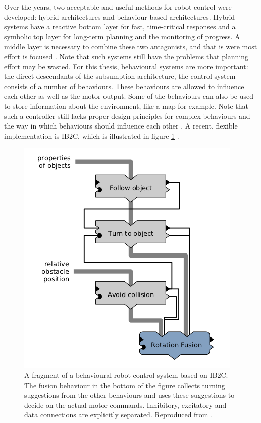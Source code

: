 \documentclass[10pt,a4paper]{report}
\begin{document}
Over the years, two acceptable and useful methods for robot control were developed: hybrid architectures and behaviour-based architectures. Hybrid systems have a reactive bottom layer for fast, time-critical responses and a symbolic top layer for long-term planning and the monitoring of progress. A middle layer is necessary to combine these two antagonists, and that is were most effort is focused \citep{Gat1997}. Note that such systems still have the problems that planning effort may be wasted. For this thesis, behavioural systems are more important: the direct descendants of the subsumption architecture, the control system consists of a number of behaviours. These behaviours are allowed to influence each other as well as the motor output. Some of the behaviours can also be used to store information about the environment, like a map for example. Note that such a controller still lacks proper design principles for complex behaviours and the way in which behaviours should influence each other \citep{Arkin1998}. A recent, flexible implementation is IB2C, which is illustrated in figure \ref{ib2c} \citep{Proetzsch2010}.

\begin{figure}[hbtp]
\begin{center}
\includegraphics[scale=0.4]{figures/ib2c.png}
\caption{ A fragment of a behavioural robot control system based on IB2C. The fusion behaviour in the bottom of the figure collects turning suggestions from the other behaviours and uses these suggestions to decide on the actual motor commands. Inhibitory, excitatory and data connections are explicitly separated. Reproduced from \citet{Proetzsch2010}.}
\label{ib2c}
\end{center}
\end{figure}
\end{document}
